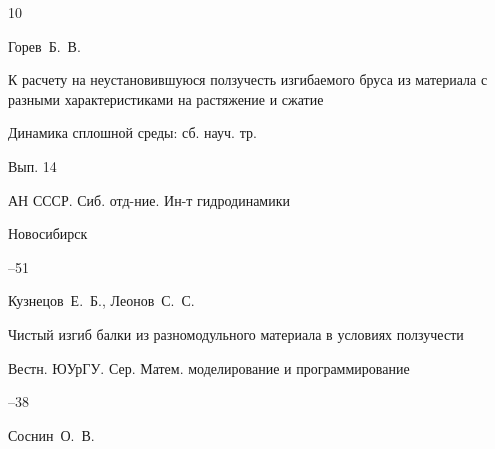 \begin{thebibliography}{10}








\by  Горев~Б.~В.

\paper К расчету на неустановившуюся ползучесть изгибаемого бруса из материала с разными характеристиками на растяжение и сжатие 

\inbook Динамика сплошной среды: сб. науч. тр.

\issueinfo Вып. 14

\publ АН СССР. Сиб. отд-ние. Ин-т гидродинамики

\publaddr Новосибирск


--51
















\by  Кузнецов~Е.~Б., Леонов~С.~С. 

\paper Чистый изгиб балки из разномодульного материала в условиях ползучести

\jour Вестн. ЮУрГУ. Сер. Матем. моделирование и программирование




--38







\by  Соснин~О.~В. 


\end{thebibliography}
